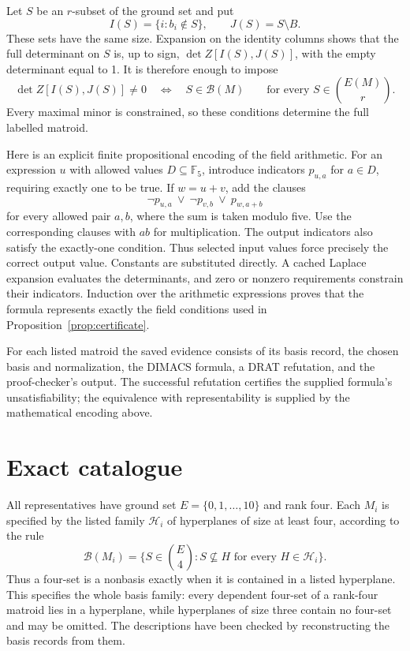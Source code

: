 \documentclass[11pt,a4paper]{article}
\theoremstyle{definition}
\newcommand{\F}{\mathbb F_5}
\newcommand{\B}{\mathcal B}
\newcommand{\HH}{\mathcal H}
\begin{document}
Let $S$ be an $r$-subset of the ground set and put
\[
 I(S)=\{i:b_i\notin S\},\qquad J(S)=S\setminus B.
\]
These sets have the same size. Expansion on the identity columns
shows that the full determinant on $S$ is, up to sign,
$\det Z[I(S),J(S)]$, with the empty determinant equal to 1.
It is therefore enough to impose
\[
 \det Z[I(S),J(S)]\ne0
 \quad\Longleftrightarrow\quad S\in\B(M)
 \qquad\text{for every }S\in\binom{E(M)}r.
\]
Every maximal minor is constrained, so these conditions determine
the full labelled matroid.

Here is an explicit finite propositional encoding of the field
arithmetic. For an expression $u$ with allowed values
$D\subseteq\F$, introduce indicators $p_{u,a}$ for $a\in D$,
requiring exactly one to be true. If $w=u+v$, add the clauses
\[
 \neg p_{u,a}\ \lor\ \neg p_{v,b}\ \lor\ p_{w,a+b}
\]
for every allowed pair $a,b$, where the sum is taken modulo five.
Use the corresponding clauses with $ab$ for multiplication.
The output indicators also satisfy the exactly-one condition.
Thus selected input values force precisely the correct output
value. Constants are substituted directly. A cached Laplace
expansion evaluates the determinants, and zero or nonzero
requirements constrain their indicators. Induction over the
arithmetic expressions proves that the formula represents
exactly the field conditions used in
Proposition~\ref{prop:certificate}.

For each listed matroid the saved evidence consists of its basis
record, the chosen basis and normalization, the DIMACS formula,
a DRAT refutation, and the proof-checker's output. The successful
refutation certifies the supplied formula's unsatisfiability;
the equivalence with representability is supplied by the
mathematical encoding above.

\section{Exact catalogue}\label{sec:catalogue}

All representatives have ground set $E=\{0,1,\ldots,10\}$ and
rank four. Each $M_i$ is specified by the listed family
$\HH_i$ of hyperplanes of size at least four, according to the
rule
\[
 \B(M_i)=\{S\in\binom E4:
                S\not\subseteq H\text{ for every }H\in\HH_i\}.
\]
Thus a four-set is a nonbasis exactly when it is contained in
a listed hyperplane. This specifies the whole basis family:
every dependent four-set of a rank-four matroid lies in a
hyperplane, while hyperplanes of size three contain no four-set
and may be omitted. The descriptions have been checked by
reconstructing the basis records from them.
\end{document}
